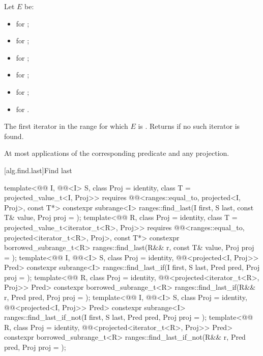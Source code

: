 \begin{itemdescr}
\pnum
Let $E$ be:
\begin{itemize}
\item {} for ;
\item {} for ;
\item {} for ;
\item {} for ;
\item {} for ;
\item {} for .
\end{itemize}

\pnum
\returns
The first iterator  in the range 
for which $E$ is .
Returns  if no such iterator is found.

\pnum
\complexity
At most  applications
of the corresponding predicate and any projection.
\end{itemdescr}

[alg.find.last]{Find last}

%
\begin{itemdecl}
template<@@ I, @@<I> S, class Proj = identity,
         class T = projected_value_t<I, Proj>>
  requires @@<ranges::equal_to, projected<I, Proj>, const T*>
  constexpr subrange<I> ranges::find_last(I first, S last, const T& value, Proj proj = {});
template<@@ R, class Proj = identity,
         class T = projected_value_t<iterator_t<R>, Proj>>
  requires @@<ranges::equal_to, projected<iterator_t<R>, Proj>, const T*>
  constexpr borrowed_subrange_t<R> ranges::find_last(R&& r, const T& value, Proj proj = {});
template<@@ I, @@<I> S, class Proj = identity,
         @@<projected<I, Proj>> Pred>
  constexpr subrange<I> ranges::find_last_if(I first, S last, Pred pred, Proj proj = {});
template<@@ R, class Proj = identity,
         @@<projected<iterator_t<R>, Proj>> Pred>
  constexpr borrowed_subrange_t<R> ranges::find_last_if(R&& r, Pred pred, Proj proj = {});
template<@@ I, @@<I> S, class Proj = identity,
         @@<projected<I, Proj>> Pred>
  constexpr subrange<I> ranges::find_last_if_not(I first, S last, Pred pred, Proj proj = {});
template<@@ R, class Proj = identity,
         @@<projected<iterator_t<R>, Proj>> Pred>
  constexpr borrowed_subrange_t<R> ranges::find_last_if_not(R&& r, Pred pred, Proj proj = {});
\end{itemdecl}

